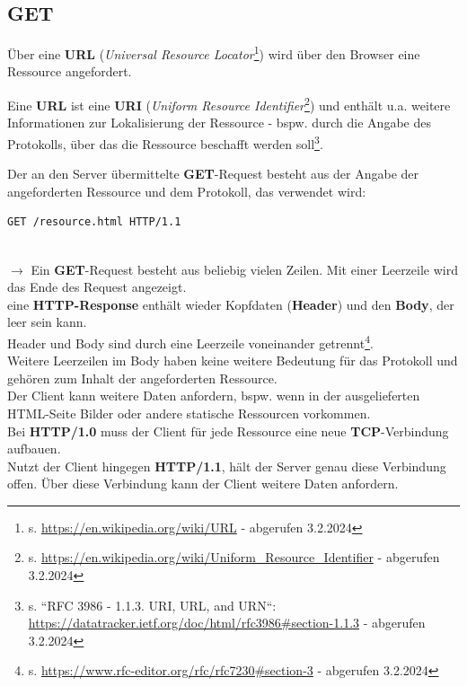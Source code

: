 \subsection{GET}

Über eine \textbf{URL} (\textit{Universal Resource Locator}\footnote{
s. \url{https://en.wikipedia.org/wiki/URL} - abgerufen 3.2.2024
}) wird über den Browser eine Ressource angefordert.


\begin{tcolorbox}
    Eine \textbf{URL} ist eine \textbf{URI} (\textit{Uniform Resource Identifier}\footnote{
        s. \url{https://en.wikipedia.org/wiki/Uniform_Resource_Identifier} - abgerufen 3.2.2024
    }) und enthält u.a. weitere Informationen zur Lokalisierung der Ressource - bspw. durch die Angabe des Protokolls, über das die Ressource beschafft werden soll\footnote{s. ``RFC 3986 - 1.1.3.  URI, URL, and URN``: \url{https://datatracker.ietf.org/doc/html/rfc3986#section-1.1.3} - abgerufen 3.2.2024}.
\end{tcolorbox}

Der an den Server übermittelte \textbf{GET}-Request besteht aus der Angabe der angeforderten Ressource und dem Protokoll, das verwendet wird:

\begin{verbatim}
GET /resource.html HTTP/1.1
\end{verbatim}
\\

$\rightarrow$ Ein \textbf{GET}-Request besteht aus beliebig vielen Zeilen.
Mit einer Leerzeile wird das Ende des Request angezeigt.\\

\noindent
eine \textbf{HTTP-Response} enthält wieder Kopfdaten (\textbf{Header}) und den \textbf{Body}, der leer sein kann.\\
Header und Body sind durch eine Leerzeile voneinander getrennt\footnote{
    s. \url{https://www.rfc-editor.org/rfc/rfc7230#section-3} - abgerufen 3.2.2024
}.\\
Weitere Leerzeilen im Body haben keine weitere Bedeutung für das Protokoll und gehören zum Inhalt der angeforderten Ressource.\\

\noindent
Der Client kann weitere Daten anfordern, bspw. wenn in der ausgelieferten HTML-Seite Bilder oder andere statische Ressourcen vorkommen.\\
Bei \textbf{HTTP/1.0} muss der Client für jede Ressource eine neue \textbf{TCP}-Verbindung aufbauen.\\
Nutzt der Client hingegen \textbf{HTTP/1.1}, hält der Server genau diese Verbindung offen.
Über diese Verbindung kann der Client weitere Daten anfordern.

